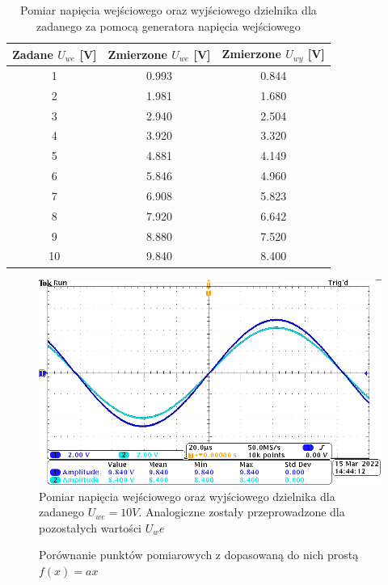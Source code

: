 \documentclass[11pt]{extarticle}
\begin{document}
	\begin{table}[htp]
		\centering
		\begin{tabular}{c|c|c}
			\hline
			Zadane \(U_{we}\) [V] & Zmierzone \(U_{we}\) [V] & Zmierzone \(U_{wy}\) [V]
			\\ \hline\hline
			1 & 0.993 & 0.844 \\ \hline
			2 & 1.981 & 1.680 \\ \hline
			3 & 2.940 & 2.504 \\ \hline
			4 & 3.920 & 3.320 \\ \hline
			5 & 4.881 & 4.149 \\ \hline
			6 & 5.846 & 4.960 \\ \hline
			7 & 6.908 & 5.823 \\ \hline
			8 & 7.920 & 6.642 \\ \hline
			9 & 8.880 & 7.520 \\ \hline
			10 & 9.840 & 8.400 \\ \hline
		\end{tabular}
		\caption{Pomiar napięcia wejściowego oraz wyjściowego dzielnika dla zadanego za pomocą generatora napięcia wejściowego}
	\end{table}

	\begin{figure}[htp]
		\centering
		\includegraphics[width=\textwidth]{include/4/10V.png}
		\caption{
			Pomiar napięcia wejściowego oraz wyjściowego dzielnika dla zadanego \(U_{we} = 10V\).
			Analogiczne zostały przeprowadzone dla pozostałych wartości \(U_we\)
		}
	\end{figure}

	\begin{figure}[htp]
		\centering
		
		\caption{Porównanie punktów pomiarowych z dopasowaną do nich prostą \(f(x) = ax\)}
	\end{figure}
\end{document}
